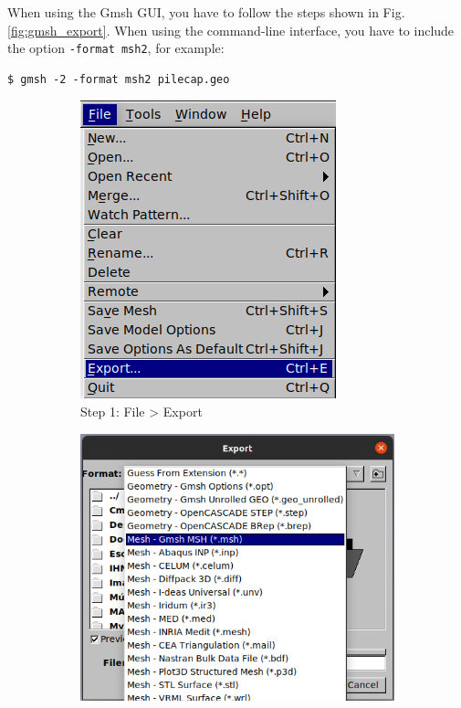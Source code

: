 \documentclass[a4paper,fleqn]{book}
\begin{document}
When using the Gmsh GUI, you have to follow the steps shown in Fig. \ref{fig:gmsh_export}. When using the command-line interface, you have to include the option \texttt{-format msh2}, for example:
\begin{Verbatim}[frame=single]
 $ gmsh -2 -format msh2 pilecap.geo
\end{Verbatim}

\begin{figure}
    \centering
    \begin{subfigure}[b]{0.39\textwidth}
        \centering
        \includegraphics[scale=0.5]{figures/gmsh_export_1.png}
        \caption{Step 1: File > Export}
    \end{subfigure}
    \hfill
    \begin{subfigure}[b]{0.6\textwidth}
        \centering
        \includegraphics[scale=0.5]{figures/gmsh_export_2.png}

\end{subfigure}
\end{figure}
\end{document}
